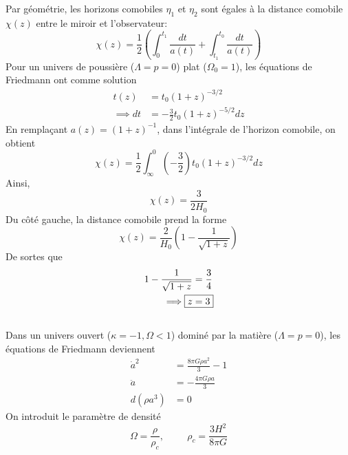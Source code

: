 \documentclass{article}
\numberwithin{equation}{section}
\begin{document}
Par géométrie, les horizons comobiles $\eta_1$ et $\eta_2$ sont égales à la distance 
comobile $\chi(z)$ entre le miroir et l'observateur:
\[
        \chi(z) = \frac{1}{2} \left( \int_0^{t_1} \frac{dt}{a(t)} 
        + \int_{t_1}^{t_0} \frac{dt}{a(t)}\right)
\]
Pour un univers de poussière ($\Lambda=p=0$) plat ($\Omega_0=1$), les équations de 
Friedmann ont comme solution
\begin{align*}
        t(z) &=  t_0 (1 + z)^{-3/2} \\
        \implies dt &= -\frac{3}{2}t_0 (1 + z)^{-5/2}dz
\end{align*}
En remplaçant $a(z) = (1 + z)^{-1}$, dans l'intégrale de l'horizon comobile, on obtient
\[
        \chi(z) = \frac{1}{2} \int_\infty^{0} \left( - \frac{3}{2} \right)t_0
        (1 + z)^{-3/2} dz
\]
Ainsi,
\[
        \chi(z) = \frac{3}{2H_0}
\]
Du côté gauche, la distance comobile prend la forme
\[
        \chi(z) = \frac{2}{H_0}\left( 1 - \frac{1}{\sqrt{1 + z}} \right)      
\]
De sortes que 
\begin{align*}
        1 - \frac{1}{\sqrt{1 + z}} &=  \frac{3}{4} \\
        \implies \Aboxed{z &= 3} 
\end{align*}



\subsection{}
Dans un univers ouvert ($\kappa  = -1, \Omega < 1$) 
dominé par la matière ($\Lambda = p = 0$), les équations de Friedmann deviennent
\begin{align*}
        \dot{a}^{2} &=  \frac{8 \pi G \rho a^2}{3} - 1 \\
        \ddot{a} &=  -\frac{4\pi G \rho a}{3} \\
        d(\rho a^3) &=  0
\end{align*}
On introduit le paramètre de densité 
\[
        \Omega = \frac{\rho}{\rho_c}, \hspace{1cm} \rho_c = \frac{3H^2}{8 \pi G}
\]
\end{document}
